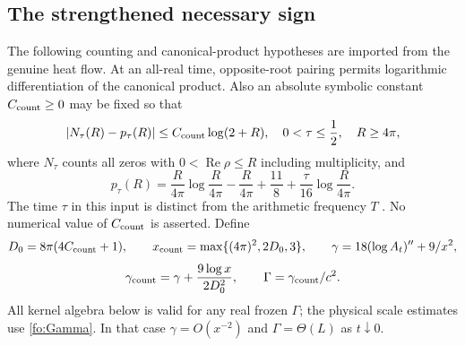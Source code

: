 \documentclass[11pt]{article}
\numberwithin{equation}{section}
\theoremstyle{definition}
\theoremstyle{remark}
\begin{document}
\subsection{The strengthened necessary sign}
\label{fo:count-threshold}
The following counting and canonical-product hypotheses are imported
from the genuine heat flow.  At an all-real time, opposite-root pairing
permits logarithmic differentiation of the canonical product.  Also an
absolute symbolic constant $C_{\rm count}\ge0$ may be fixed so that
\begin{equation}
|N_\tau(R)-p_\tau(R)|\le C_{\rm count}\log(2+R),
\quad 0<\tau\le\frac12,\quad R\ge4\pi,
\label{fo:count-input}
\end{equation}
where $N_\tau$ counts all zeros with $0<\operatorname{Re}\rho\le R$
including multiplicity, and
\begin{equation}
p_\tau(R)=\frac R{4\pi}\log\frac R{4\pi}-\frac R{4\pi}
             +\frac{11}{8}+\frac\tau{16}\log\frac R{4\pi}.
\end{equation}
The time $\tau$ in this input is distinct from the arithmetic
frequency $T$ \cite{polymath,heatnotes}.  No numerical value of
$C_{\rm count}$ is asserted.
Define
\begin{equation}
D_0=8\pi(4C_{\rm count}+1),\qquad
x_{\rm count}=\max\{(4\pi)^2,2D_0,3\},\qquad
\gamma=18(\log A_t)''+9/x^2,
\end{equation}
\begin{equation}
\gamma_{\rm count}=\gamma+\frac{9\log x}{2D_0^2},\qquad
\Gamma=\gamma_{\rm count}/c^2.
\label{fo:Gamma}
\end{equation}
All kernel algebra below is valid for any real frozen $\Gamma$;
the physical scale estimates use \eqref{fo:Gamma}.  In that case
$\gamma=O(x^{-2})$ and $\Gamma=\Theta(L)$ as $t\downarrow0$.
\end{document}
